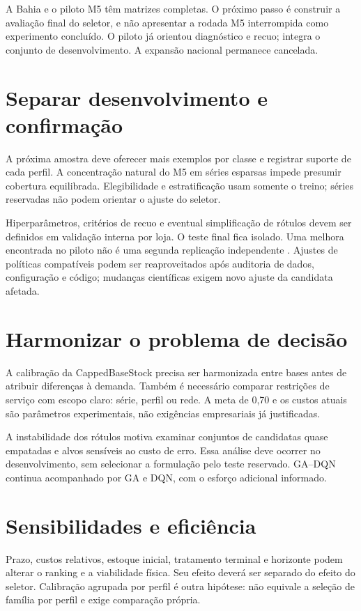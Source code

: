 
A Bahia e o piloto M5 têm matrizes completas. O próximo passo é construir a avaliação final do seletor, e não apresentar a rodada M5 interrompida como experimento concluído. O piloto já orientou diagnóstico e recuo; integra o conjunto de desenvolvimento. A expansão nacional permanece cancelada.

\section{Separar desenvolvimento e confirmação}
\label{sec:estudos_caso_adicionais}
A próxima amostra deve oferecer mais exemplos por classe e registrar suporte de cada perfil. A concentração natural do M5 em séries esparsas impede presumir cobertura equilibrada. Elegibilidade e estratificação usam somente o treino; séries reservadas não podem orientar o ajuste do seletor.

Hiperparâmetros, critérios de recuo e eventual simplificação de rótulos devem ser definidos em validação interna por loja. O teste final fica isolado. Uma melhora encontrada no piloto não é uma segunda replicação independente \citep{CawleyTalbot2010}. Ajustes de políticas compatíveis podem ser reaproveitados após auditoria de dados, configuração e código; mudanças científicas exigem novo ajuste da candidata afetada.

\section{Harmonizar o problema de decisão}
A calibração da CappedBaseStock precisa ser harmonizada entre bases antes de atribuir diferenças à demanda. Também é necessário comparar restrições de serviço com escopo claro: série, perfil ou rede. A meta de 0,70 e os custos atuais são parâmetros experimentais, não exigências empresariais já justificadas.

A instabilidade dos rótulos motiva examinar conjuntos de candidatas quase empatadas e alvos sensíveis ao custo de erro. Essa análise deve ocorrer no desenvolvimento, sem selecionar a formulação pelo teste reservado. GA--DQN continua acompanhado por GA e DQN, com o esforço adicional informado.

\section{Sensibilidades e eficiência}
\label{sec:robustez_pooling}
Prazo, custos relativos, estoque inicial, tratamento terminal e horizonte podem alterar o ranking e a viabilidade física. Seu efeito deverá ser separado do efeito do seletor. Calibração agrupada por perfil é outra hipótese: não equivale a seleção de família por perfil e exige comparação própria.

